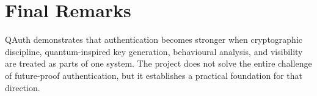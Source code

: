 \documentclass[12pt,a4paper]{report}
\begin{document}
\section{Final Remarks}
QAuth demonstrates that authentication becomes stronger when cryptographic discipline, quantum-inspired key generation, behavioural analysis, and visibility are treated as parts of one system. The project does not solve the entire challenge of future-proof authentication, but it establishes a practical foundation for that direction.





\nocite{*}

\end{document}
